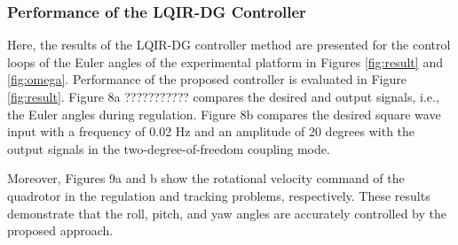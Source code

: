 \documentclass[3p,times]{elsarticle}
\begin{document}
\subsubsection{Performance of the LQIR-DG Controller}\label{sec:regulation}
\noindent Here, the results of the LQIR-DG controller method are presented for the control loops of the Euler angles of the experimental platform in Figures \ref{fig:result} and \ref{fig:omega}.
Performance of the proposed controller is evaluated in Figure \ref{fig:result}.
Figure 8a ??????????? compares the desired and output signals, i.e., the Euler angles during regulation. Figure 8b compares the desired square wave input with a frequency of 0.02 Hz and an amplitude of 20 degrees with the output signals in the two-degree-of-freedom coupling mode.

Moreover, Figures 9a and b show the rotational velocity command of the quadrotor in the regulation and tracking problems, respectively. These results demonstrate that the roll, pitch, and yaw angles are accurately controlled by the proposed approach.
\end{document}
